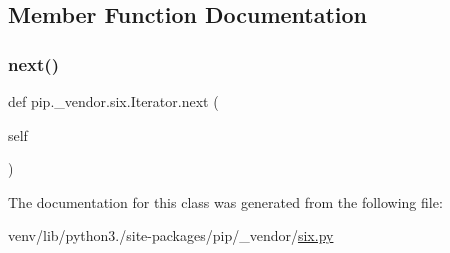 \subsection{Member Function Documentation}
\mbox{\label{classpip_1_1__vendor_1_1six_1_1Iterator_a322170436d350f8010920c8992f1fc69}} 
\subsubsection{\texorpdfstring{next()}{next()}}
{\footnotesize\ttfamily def pip.\+\_\+vendor.\+six.\+Iterator.\+next (\begin{DoxyParamCaption}\item[{}]{self }\end{DoxyParamCaption})}



The documentation for this class was generated from the following file\+:\begin{DoxyCompactItemize}
\item 
venv/lib/python3./site-\/packages/pip/\+\_\+vendor/\hyperlink{pip_2__vendor_2six_8py}{six.\+py}\end{DoxyCompactItemize}

